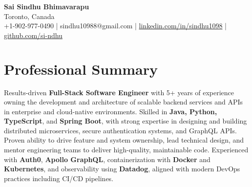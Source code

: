 \documentclass[letterpaper,11pt]{article}
\begin{document}
\begin{center}
  {\Large \textbf{Sai Sindhu Bhimavarapu}} \\
  Toronto, Canada \\
  +1-902-977-0490 \enspace | \enspace sindhu10988@gmail.com \enspace | \enspace \href{https://www.linkedin.com/in/sindhu1098/}{linkedin.com/in/sindhu1098} \enspace | \enspace \href{https://github.com/si-ndhu}{github.com/si-ndhu}
\end{center}

\section{Professional Summary}
  \begin{itemize}[leftmargin=0.15in, label={}]
    \small{\item{
     Results-driven \textbf{Full-Stack Software Engineer} with 5+ years of experience owning the development and architecture of scalable backend services and APIs in enterprise and cloud-native environments. Skilled in \textbf{Java, Python, TypeScript}, and \textbf{Spring Boot}, with strong expertise in designing and building distributed microservices, secure authentication systems, and GraphQL APIs. Proven ability to drive feature and system ownership, lead technical design, and mentor engineering teams to deliver high-quality, maintainable code. Experienced with \textbf{Auth0}, \textbf{Apollo GraphQL}, containerization with \textbf{Docker} and \textbf{Kubernetes}, and observability using \textbf{Datadog}, aligned with modern DevOps practices including CI/CD pipelines.
    }}
  \end{itemize}
\vspace{-16pt}

\end{document}
